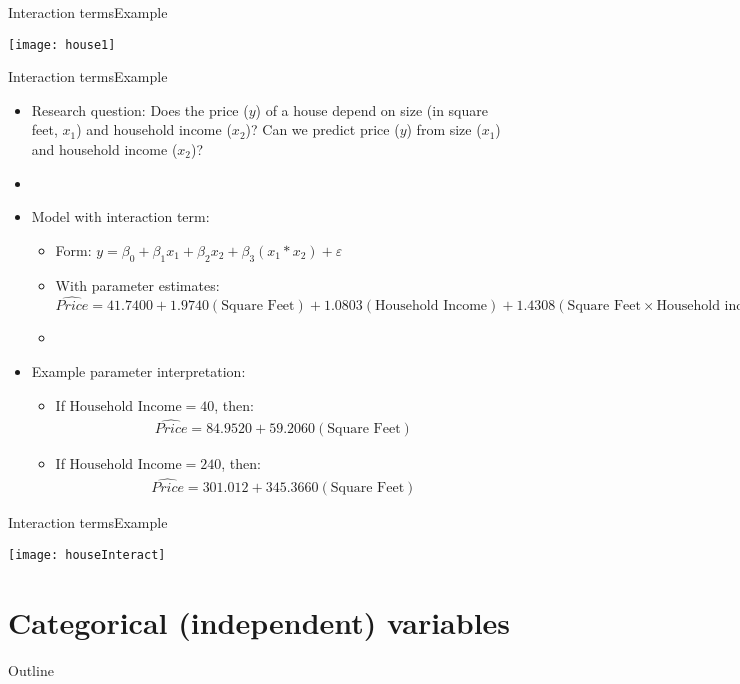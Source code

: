 \documentclass[xcolor=dvipsnames]{beamer}
\begin{document}
\begin{frame}{Interaction terms}{Example}
	\begin{center}
		\texttt{[image: house1]}
	\end{center}
\end{frame}

\begin{frame}{Interaction terms}{Example}
	\begin{itemize}
		\item Research question: Does the price ($y$) of a house depend on size (in square feet, $x_1$) and household income ($x_2$)? Can we predict price ($y$) from size ($x_1$) and household income ($x_2$)?
		\item[]
		\item Model with interaction term:
		\begin{itemize}
			\item Form: $y = \beta_0 + \beta_1 x_1 + \beta_2 x_2 + \beta_3 (x_1 * x_2) + \varepsilon$
			\item With parameter estimates: $\hat{Price} = 41.7400 + 1.9740 (\text{Square Feet}) + 1.0803 (\text{Household Income})+ 1.4308 (\text{Square Feet}\times \text{Household income}) $
			\item[]
		\end{itemize}
	\item Example parameter interpretation:
	\begin{itemize}
		\item If $\text{Household Income} = 40$, then:
		\begin{align*}
			\hat{Price} = 84.9520 + 59.2060 (\text{Square Feet}) 
		\end{align*}
		\item If $\text{Household Income} = 240$, then:
		\begin{align*}
		\hat{Price} = 301.012 + 345.3660 (\text{Square Feet}) 
		\end{align*}
	\end{itemize}
	\end{itemize}
\end{frame}

\begin{frame}{Interaction terms}{Example}
	\begin{center}
		\texttt{[image: houseInteract]}
	\end{center}
\end{frame}

\section{Categorical (independent) variables}
\begin{frame}{Outline}
	\tableofcontents[currentsection,subsectionstyle=show/shaded/hide]
\end{frame}
\end{document}
